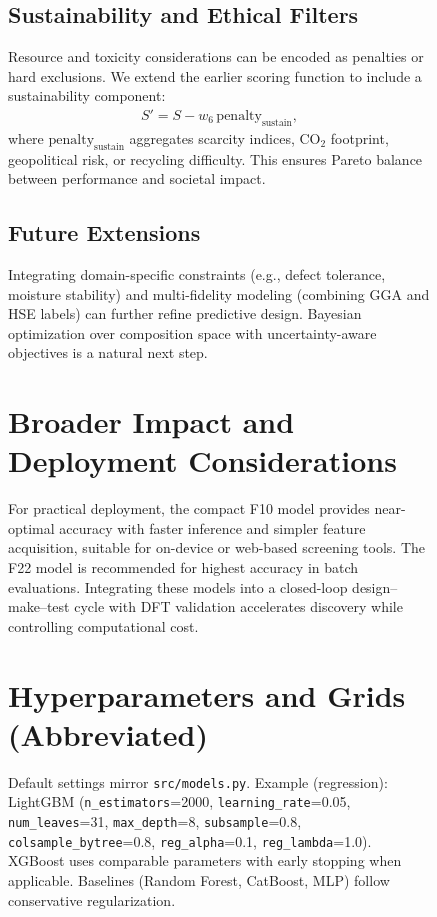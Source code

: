 \documentclass[conference]{IEEEtran}
\begin{document}
\begin{figure}[t!]
\subsection{Sustainability and Ethical Filters}
Resource and toxicity considerations can be encoded as penalties or hard exclusions. We extend the earlier scoring function to include a sustainability component:
\begin{align}
S' = S - w_6\,\mathrm{penalty}_{\mathrm{sustain}},
\end{align}
where $\mathrm{penalty}_{\mathrm{sustain}}$ aggregates scarcity indices, CO$_2$ footprint, geopolitical risk, or recycling difficulty. This ensures Pareto balance between performance and societal impact.

\subsection{Future Extensions}
Integrating domain-specific constraints (e.g., defect tolerance, moisture stability) and multi-fidelity modeling (combining GGA and HSE labels) can further refine predictive design. Bayesian optimization over composition space with uncertainty-aware objectives is a natural next step.

\section{Broader Impact and Deployment Considerations}
For practical deployment, the compact F10 model provides near-optimal accuracy with faster inference and simpler feature acquisition, suitable for on-device or web-based screening tools. The F22 model is recommended for highest accuracy in batch evaluations. Integrating these models into a closed-loop design--make--test cycle with DFT validation accelerates discovery while controlling computational cost.

\appendices
\section{Hyperparameters and Grids (Abbreviated)}\label{app:hyper}
Default settings mirror \texttt{src/models.py}. Example (regression): LightGBM (\texttt{n\_estimators}=2000, \texttt{learning\_rate}=0.05, \texttt{num\_leaves}=31, \texttt{max\_depth}=8, \texttt{subsample}=0.8, \texttt{colsample\_bytree}=0.8, \texttt{reg\_alpha}=0.1, \texttt{reg\_lambda}=1.0). XGBoost uses comparable parameters with early stopping when applicable. Baselines (Random Forest, CatBoost, MLP) follow conservative regularization.


\end{figure}
\end{document}
